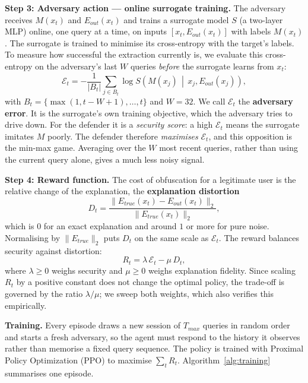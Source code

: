 \documentclass[conference]{IEEEtran}
\begin{document}
\textbf{Step 3: Adversary action --- online surrogate training.}
The adversary receives $M(x_t)$ and $E_{out}(x_t)$ and trains a surrogate model $S$ (a two-layer MLP) online, one query at a time, on inputs $[x_t, E_{out}(x_t)]$ with labels $M(x_t)$. The surrogate is trained to minimise its cross-entropy with the target's labels. To measure how successful the extraction currently is, we evaluate this cross-entropy on the adversary's last $W$ queries \emph{before} the surrogate learns from $x_t$:
\begin{equation}
\mathcal{E}_t = -\frac{1}{|B_t|}\sum_{j\in B_t} \log S\!\left(M(x_j)\,\middle|\,x_j, E_{out}(x_j)\right),
\label{eq:adv_error}
\end{equation}
with $B_t=\{\max(1,t-W+1),\dots,t\}$ and $W=32$. We call $\mathcal{E}_t$ the \textbf{adversary error}. It is the surrogate's own training objective, which the adversary tries to drive down. For the defender it is a \emph{security score}: a high $\mathcal{E}_t$ means the surrogate imitates $M$ poorly. The defender therefore \emph{maximises} $\mathcal{E}_t$, and this opposition is the min-max game. Averaging over the $W$ most recent queries, rather than using the current query alone, gives a much less noisy signal.

\textbf{Step 4: Reward function.}
The cost of obfuscation for a legitimate user is the relative change of the explanation, the \textbf{explanation distortion}
\begin{equation}
D_t = \frac{\lVert E_{true}(x_t) - E_{out}(x_t)\rVert_2}{\lVert E_{true}(x_t)\rVert_2},
\label{eq:distortion}
\end{equation}
which is $0$ for an exact explanation and around $1$ or more for pure noise. Normalising by $\lVert E_{true}\rVert_2$ puts $D_t$ on the same scale as $\mathcal{E}_t$. The reward balances security against distortion:
\begin{equation}
R_t = \lambda\,\mathcal{E}_t - \mu\,D_t,
\label{eq:reward}
\end{equation}
where $\lambda\ge0$ weighs security and $\mu\ge0$ weighs explanation fidelity. Since scaling $R_t$ by a positive constant does not change the optimal policy, the trade-off is governed by the ratio $\lambda/\mu$; we sweep both weights, which also verifies this empirically.

\textbf{Training.} Every episode draws a new session of $T_{max}$ queries in random order and starts a fresh adversary, so the agent must respond to the history it observes rather than memorise a fixed query sequence. The policy is trained with Proximal Policy Optimization (PPO) to maximise $\sum_t R_t$. Algorithm~\ref{alg:training} summarises one episode.
\end{document}
